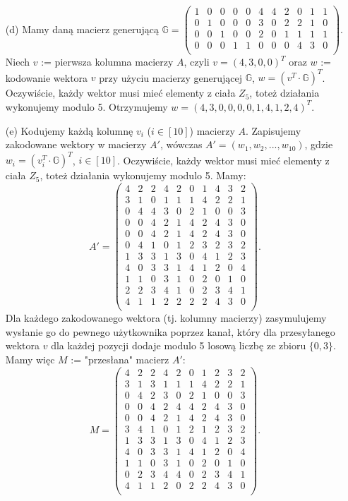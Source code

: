 \documentclass[10pt]{article} %
\begin{document}
\begin{enumerate}
\item[(d)]
Mamy daną macierz generującą $\mathbb{G} = \begin{pmatrix} 1&0&0&0&0&4&4&2&0&1&1\\
0&1&0&0&0&3&0&2&2&1&0\\
0&0&1&0&0&2&0&1&1&1&1\\
0&0&0&1&1&0&0&0&4&3&0\\
\end{pmatrix}$.\vspace{10pt} \\
 Niech $v$ := pierwsza kolumna macierzy $A$, czyli $v = (4, 3, 0,0 )^T$ oraz $w$ := kodowanie wektora $v$ przy użyciu macierzy generującej $\mathbb{G}$, $w = (v^T \cdot \mathbb{G})^T$. Oczywiście, każdy wektor musi mieć elementy z ciała $Z_5$, toteż działania wykonujemy modulo 5. Otrzymujemy $w = (4, 3, 0, 0, 0, 0, 1, 4, 1, 2, 4)^T$.
\newpage
\item[(e)]
Kodujemy każdą kolumnę $v_i$ ($i \in [10]$) macierzy $A$. Zapisujemy zakodowane wektory w macierzy $A'$, wówczas $A' = (w_1, w_2, ..., w_{10})$, gdzie $w_i = (v_i^T \cdot \mathbb{G})^T$, $i \in [10]$. Oczywiście, każdy wektor musi mieć elementy z ciała $Z_5$, toteż działania wykonujemy modulo 5. Mamy:
$$ A' = \begin{pmatrix} 4&2&2&4&2&0&1&4&3&2\\
3&1&0&1&1&1&4&2&2&1\\
0&4&4&3&0&2&1&0&0&3\\
0&0&4&2&1&4&2&4&3&0\\
0&0&4&2&1&4&2&4&3&0\\
0&4&1&0&1&2&3&2&3&2\\
1&3&3&1&3&0&4&1&2&3\\
4&0&3&3&1&4&1&2&0&4\\
1&1&0&3&1&0&2&0&1&0\\
2&2&3&4&1&0&2&3&4&1\\
4&1&1&2&2&2&2&4&3&0\\
\end{pmatrix} .$$
Dla każdego zakodowanego wektora (tj. kolumny macierzy) zasymulujemy wysłanie go do pewnego użytkownika poprzez kanał, który dla przesyłanego wektora $v$ dla każdej pozycji dodaje modulo 5 losową liczbę ze zbioru $\{0, 3\}$. Mamy więc $M$ := "przesłana" macierz $A'$:
$$ M = \begin{pmatrix} 4&2&2&4&2&0&1&2&3&2\\
3&1&3&1&1&1&4&2&2&1\\
0&4&2&3&0&2&1&0&0&3\\
0&0&4&2&4&4&2&4&3&0\\
0&0&4&2&1&4&2&4&3&0\\
3&4&1&0&1&2&1&2&3&2\\
1&3&3&1&3&0&4&1&2&3\\
4&0&3&3&1&4&1&2&0&4\\
1&1&0&3&1&0&2&0&1&0\\
0&2&3&4&4&0&2&3&4&1\\
4&1&1&2&0&2&2&4&3&0\\
\end{pmatrix} .$$


\end{enumerate}
\end{document}
